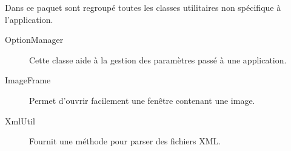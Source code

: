 Dans ce paquet sont regroupé toutes les classes utilitaires non spécifique à l'application. 

\begin{description}
\item[OptionManager] Cette classe aide à la gestion des paramètres passé à une application.

\item[ImageFrame] Permet d'ouvrir facilement une fenêtre contenant une image.

\item[XmlUtil] Fournit une méthode pour parser des fichiers XML.
\end{description}

